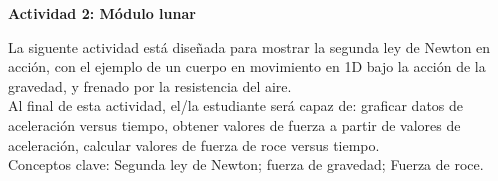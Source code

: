 \documentclass[11pt]{exam}
\begin{document}
\sffamily

\firstpageheadrule
{}
\runningheadrule
\rfoot{\thepage\ / \numpages}
\cfoot{ }
\lfoot{\tiny }
\begin{flushleft}
\vspace{0.2in}
\vspace{0.25cm}
\end{flushleft}
\begin{center}
\textbf{Actividad 2: Módulo lunar}
\end{center}

La siguente actividad está diseñada para mostrar la segunda ley de Newton en acción, con el ejemplo de un cuerpo en movimiento en 1D bajo la acción de la gravedad, y frenado por la resistencia del aire. \\

Al final de esta actividad, el/la estudiante será capaz de: graficar datos de aceleración versus tiempo, obtener valores de fuerza a partir de valores de aceleración, calcular valores de fuerza de roce versus tiempo.\\

Conceptos clave: Segunda ley de Newton; fuerza de gravedad; Fuerza de roce.\\
\end{document}

